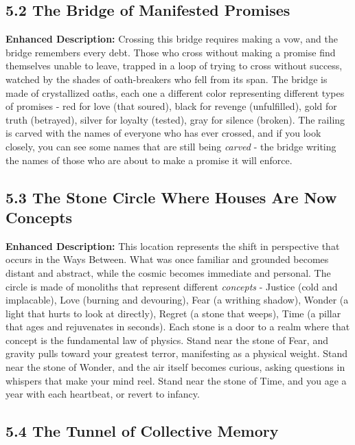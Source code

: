 \documentclass[11pt]{article}
\begin{document}
\subsection*{5.2 The Bridge of Manifested Promises}

\textbf{Enhanced Description:} Crossing this bridge requires making a vow, and the bridge remembers every debt. Those who cross without making a promise find themselves unable to leave, trapped in a loop of trying to cross without success, watched by the shades of oath-breakers who fell from its span. The bridge is made of crystallized oaths, each one a different color representing different types of promises - red for love (that soured), black for revenge (unfulfilled), gold for truth (betrayed), silver for loyalty (tested), gray for silence (broken). The railing is carved with the names of everyone who has ever crossed, and if you look closely, you can see some names that are still being \textit{carved} - the bridge writing the names of those who are about to make a promise it will enforce.

\subsection*{5.3 The Stone Circle Where Houses Are Now Concepts}

\textbf{Enhanced Description:} This location represents the shift in perspective that occurs in the Ways Between. What was once familiar and grounded becomes distant and abstract, while the cosmic becomes immediate and personal. The circle is made of monoliths that represent different \textit{concepts} - Justice (cold and implacable), Love (burning and devouring), Fear (a writhing shadow), Wonder (a light that hurts to look at directly), Regret (a stone that weeps), Time (a pillar that ages and rejuvenates in seconds). Each stone is a door to a realm where that concept is the fundamental law of physics. Stand near the stone of Fear, and gravity pulls toward your greatest terror, manifesting as a physical weight. Stand near the stone of Wonder, and the air itself becomes curious, asking questions in whispers that make your mind reel. Stand near the stone of Time, and you age a year with each heartbeat, or revert to infancy.

\subsection*{5.4 The Tunnel of Collective Memory}
\end{document}
